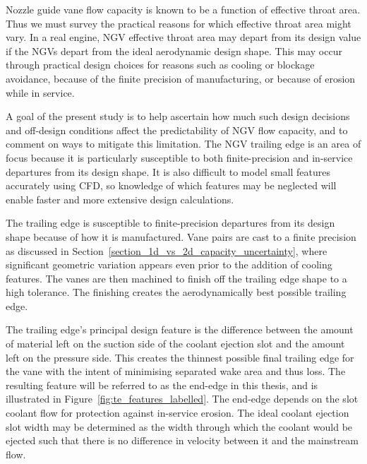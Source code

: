 \documentclass[a4paper, 11pt, oneside]{report}
\begin{document}
Nozzle guide vane flow capacity is known to be a function of effective throat area. Thus we must survey the practical reasons for which effective throat area might vary. In a real engine, NGV effective throat area may depart from its design value if the NGVs depart from the ideal aerodynamic design shape. This may occur through practical design choices for reasons such as cooling or blockage avoidance, because of the finite precision of manufacturing, or because of erosion while in service. 

A goal of the present study is to help ascertain how much such design decisions and off-design conditions affect the predictability of NGV flow capacity, and to comment on ways to mitigate this limitation. The NGV trailing edge is an area of focus because it is particularly susceptible to both finite-precision and in-service departures from its design shape. It is also difficult to model small features accurately using CFD, so knowledge of which features may be neglected will enable faster and more extensive design calculations.

The trailing edge is susceptible to finite-precision departures from its design shape because of how it is manufactured. Vane pairs are cast to a finite precision as discussed in Section~\ref{section_1d_vs_2d_capacity_uncertainty}, where significant geometric variation appears even prior to the addition of cooling features. The vanes are then machined to finish off the trailing edge shape to a high tolerance. The finishing creates the aerodynamically best possible trailing edge. 

The trailing edge's principal design feature is the difference between the amount of material left on the suction side of the coolant ejection slot and the amount left on the pressure side. This creates the thinnest possible final trailing edge for the vane with the intent of minimising separated wake area and thus loss. The resulting feature will be referred to as the end-edge in this thesis, and is illustrated in Figure~\ref{fig:te_features_labelled}. The end-edge depends on the slot coolant flow for protection against in-service erosion. The ideal coolant ejection slot width may be determined as the width through which the coolant would be ejected such that there is no difference in velocity between it and the mainstream flow.
\end{document}

